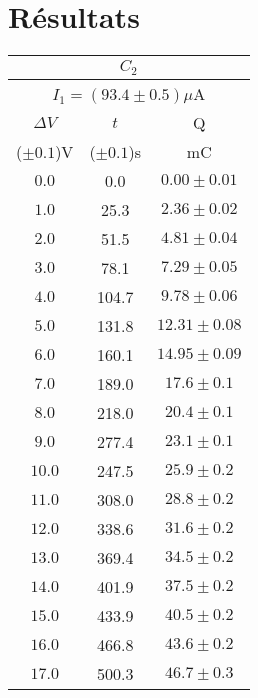 \documentclass[11pt]{article}
\begin{document}
\section{Résultats}
\begin{minipage}{0.45\textwidth}
\begin{center}
\begin{tabular}{|c|c|c|}
	\hline
	\multicolumn{3}{|c|}{$C_{2}$}\\
	\hline
	\multicolumn{3}{|c|}{$I_{1}=(93.4\pm 0.5)\mu$A}\\
	\hline
	$\Delta V $  & $t$          & Q\\
	($\pm 0.1$)V & ($\pm 0.1$)s & mC\\
	\hline
	$ 0.0$ &   0.0 & $ 0.00\pm 0.01$\\
	$ 1.0$ &  25.3 & $ 2.36\pm 0.02$\\
	$ 2.0$ &  51.5 & $ 4.81\pm 0.04$\\
	$ 3.0$ &  78.1 & $ 7.29\pm 0.05$\\
	$ 4.0$ & 104.7 & $ 9.78\pm 0.06$\\
	$ 5.0$ & 131.8 & $12.31\pm 0.08$\\
	$ 6.0$ & 160.1 & $14.95\pm 0.09$\\
	$ 7.0$ & 189.0 & $17.6 \pm 0.1 $\\
	$ 8.0$ & 218.0 & $20.4 \pm 0.1 $\\
	$ 9.0$ & 277.4 & $23.1 \pm 0.1 $\\
	$10.0$ & 247.5 & $25.9 \pm 0.2 $\\
	$11.0$ & 308.0 & $28.8 \pm 0.2 $\\
	$12.0$ & 338.6 & $31.6 \pm 0.2 $\\
	$13.0$ & 369.4 & $34.5 \pm 0.2 $\\
	$14.0$ & 401.9 & $37.5 \pm 0.2 $\\
	$15.0$ & 433.9 & $40.5 \pm 0.2 $\\
	$16.0$ & 466.8 & $43.6 \pm 0.2 $\\
	$17.0$ & 500.3 & $46.7 \pm 0.3 $\\
	\hline
\end{tabular}
\end{center}
\end{minipage}
\hfill
\end{document}
